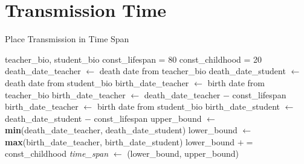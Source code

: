 \documentclass[12pt,english]{article}
\newcommand{\myindent}[1]{
\newline\makebox[#1cm]{}
}
\begin{document}
\section{Transmission Time}
\begin{center}
\begin{minipage}{.8\linewidth}
\begin{algorithm}[H]
\caption{Place Transmission in Time Span}\label{euclid}
\begin{algorithmic}[1]
\Require teacher\_bio, student\_bio
\State const\_lifespan = 80
\State const\_childhood = 20
\State death\_date\_teacher $\gets$ death date from  teacher\_bio
\State death\_date\_student $\gets$ death date from student\_bio
    \State birth\_date\_teacher $\gets$ birth date from  teacher\_bio
\Else
    \State birth\_date\_teacher $\gets$ death\_date\_teacher \myindent{4.2} $-$  const\_lifespan
\EndIf 
{}
    \State birth\_date\_teacher $\gets$ birth date from student\_bio
\Else
    \State birth\_date\_student $\gets$ death\_date\_student \myindent{4.2} $-$ const\_lifespan
\EndIf 
\State upper\_bound $\gets$ \textbf{min}(death\_date\_teacher, death\_date\_student)
\State lower\_bound $\gets$ \textbf{max}(birth\_date\_teacher, birth\_date\_student)
{}
    \State lower\_bound $\mathrel{+}=$ const\_childhood
\EndIf 
\State \textit{time\_span} $\gets$ (lower\_bound, upper\_bound)
\end{algorithmic}
\end{algorithm}
\end{minipage}
\end{center}

\begin{figure}
   
\end{figure}
\end{document}
